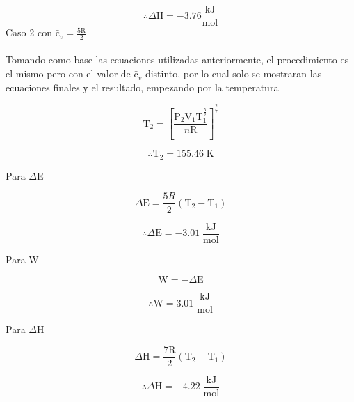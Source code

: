 \documentclass[12pt]{article}
\begin{document}
\begin{displaymath}
	\therefore\Delta\mathrm{H}=-3.76\frac{\mathrm{kJ}}{\mathrm{mol}}
\end{displaymath}
\newpage
Caso 2 con $\mathrm{\bar{c}}_v=\frac{5\mathrm{R}}{2}$\\
\\
Tomando como base las ecuaciones utilizadas anteriormente, el procedimiento es el mismo pero con el valor de $\mathrm{\bar{c}}_v$ distinto, por lo cual solo se mostraran las ecuaciones finales y el resultado, empezando por la temperatura

\begin{displaymath}
	\mathrm{T}_2=\left[ \frac{\mathrm{P}_2\mathrm{V}_1\mathrm{T}_1^{\frac{5}{2}}}{n\mathrm{R}} \right]^{\frac{2}{7}}
\end{displaymath}

\begin{displaymath}
	\therefore\mathrm{T}_2=155.46\;\mathrm{K}
\end{displaymath}

Para $\Delta\mathrm{E}$

\begin{displaymath}
	\Delta\mathrm{E}=\frac{5R}{2}(\mathrm{T}_2-\mathrm{T}_1)
\end{displaymath}

\begin{displaymath}
	\therefore\Delta\mathrm{E}=-3.01\;\frac{\mathrm{kJ}}{\mathrm{mol}}
\end{displaymath}

Para $\mathrm{W}$

\begin{displaymath}
	\mathrm{W}=-\Delta\mathrm{E}
\end{displaymath}

\begin{displaymath}
	\therefore\mathrm{W}=3.01\;\frac{\mathrm{kJ}}{\mathrm{mol}}
\end{displaymath}

Para $\Delta\mathrm{H}$

\begin{displaymath}
	\Delta\mathrm{H}=\frac{7\mathrm{R}}{2}(\mathrm{T}_2-\mathrm{T}_1)
\end{displaymath}

\begin{displaymath}
	\therefore\Delta\mathrm{H}=-4.22\;\frac{\mathrm{kJ}}{\mathrm{mol}}
\end{displaymath}
\newpage
\end{document}
